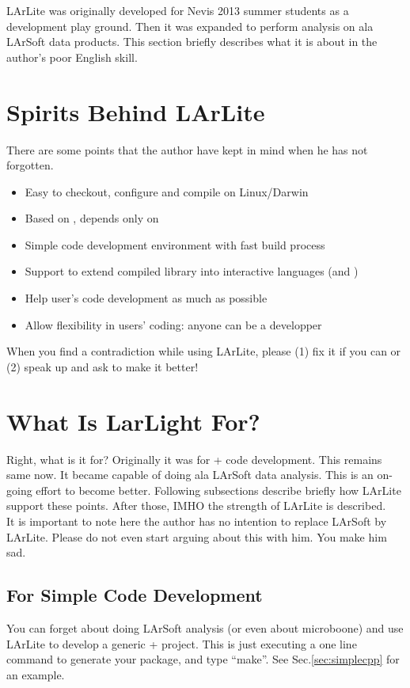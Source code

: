 
LArLite was originally developed for Nevis 2013 summer students as a \CPP development play ground.
Then it was expanded to perform analysis on ala LArSoft data products. 
This section briefly describes what it is about in the author's poor English skill.

\section{Spirits Behind LArLite}
There are some points that the author have kept in mind when he has not forgotten.
\begin{itemize}
\item Easy to checkout, configure and compile on Linux/Darwin
\item Based on \CPP, depends only on \ROOT
\item Simple code development environment with fast build process
\item Support to extend compiled library into interactive languages (\python and \CINT)
\item Help user's code development as much as possible
\item Allow flexibility in users' coding: anyone can be a developper
\end{itemize}
When you find a contradiction while using LArLite, please (1) fix it if you can or (2) speak up and ask to make it better! 

\section{What Is LarLight For?}
Right, what is it for?
Originally it was for \CPP + \ROOT code development. This remains same now.
It became capable of doing ala LArSoft data analysis. This is an on-going effort to become better.
Following subsections describe briefly how LArLite support these points.
After those, IMHO the strength of LArLite is described.\\

It is important to note here the author has no intention to replace LArSoft by LArLite. 
Please do not even start arguing about this with him. You make him sad.

\subsection{For Simple \CPP Code Development}
You can forget about doing LArSoft analysis (or even about microboone) and use LArLite to develop a generic \CPP + \ROOT project. This is just executing a one line command to generate your package, and type ``make''. See Sec.\ref{sec:simplecpp} for an example.

